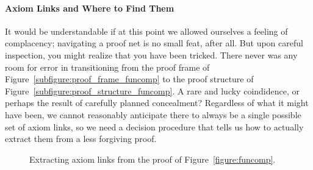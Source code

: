 \paragraph{Axiom Links and Where to Find Them}
It would be understandable if at this point we allowed ourselves a feeling of complacency; navigating a proof net is no small feat, after all.
But upon careful inspection, you might realize that you have been tricked.
There never was any room for error in transitioning from the proof frame of Figure~\ref{subfigure:proof_frame_funcomp} to the proof structure of Figure~\ref{subfigure:proof_structure_funcomp}. 
A rare and lucky coindidence, or perhaps the result of carefully planned concealment?
Regardless of what it might have been, we cannot reasonably anticipate there to always be a single possible set of axiom links, so we need a decision procedure that tells us how to actually extract them from a less forgiving proof.

\begin{figure}
	\centering
	\caption{Extracting axiom links from the proof of Figure~\ref{figure:funcomp}.}
	\label{figure:funcomp_annotated}
\end{figure}

